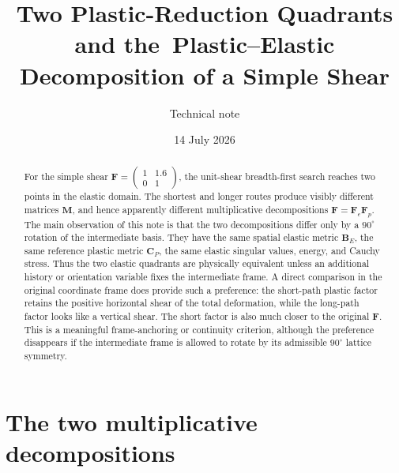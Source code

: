 \documentclass[11pt]{article}
\title{Two Plastic-Reduction Quadrants and the\
Plastic--Elastic Decomposition of a Simple Shear}
\author{Technical note}
\date{14 July 2026}
\begin{document}
\maketitle

\begin{abstract}
For the simple shear
\(
 \mathbf F=\left(\begin{smallmatrix}1&1.6\\0&1\end{smallmatrix}\right)
\), the unit-shear breadth-first search reaches two points in the elastic
domain.  The shortest and longer routes produce visibly different matrices
\(\mathbf M\), and hence apparently different multiplicative decompositions
\(\mathbf F=\mathbf F_e\mathbf F_p\).  The main observation of this note is
that the two decompositions differ only by a $90^\circ$ rotation of the
intermediate basis.  They have the same spatial elastic metric
\(\mathbf B_E\), the same reference plastic metric \(\mathbf C_P\), the same
elastic singular values, energy, and Cauchy stress.  Thus the two elastic
quadrants are physically equivalent unless an additional history or
orientation variable fixes the intermediate frame.  A direct comparison in
the original coordinate frame does provide such a preference: the short-path
plastic factor retains the positive horizontal shear of the total
deformation, while the long-path factor looks like a vertical shear.  The
short factor is also much closer to the original \(\mathbf F\).  This is a
meaningful frame-anchoring or continuity criterion, although the preference
disappears if the intermediate frame is allowed to rotate by its admissible
$90^\circ$ lattice symmetry.
\end{abstract}

\section{The two multiplicative decompositions}
\end{document}
